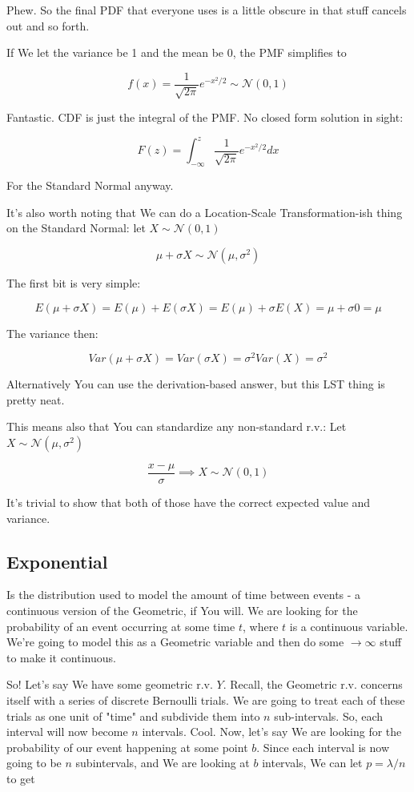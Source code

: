 \documentclass{article}
\begin{document}
		Phew. So the final PDF that everyone uses is a little obscure in that stuff cancels out and so forth.	
		
		If We let the variance be 1 and the mean be 0, the PMF simplifies to
		
		\[ f(x) = \frac{1}{\sqrt{2\pi}} e^{-x^2/2} \sim \mathcal{N}(0, 1)  \]
		
		Fantastic. CDF is just the integral of the PMF. No closed form solution in sight:
		 
		\[ F(z) = \int^z_{-\infty} \frac{1}{\sqrt{2\pi}} e^{-x^2/2} dx   \]
		
		For the Standard Normal anyway. 
		
		It's also worth noting that We can do a Location-Scale Transformation-ish thing on the Standard Normal: let $X\sim \mathcal{N}(0, 1)$
		
		\[ \mu + \sigma X \sim \mathcal{N}(\mu, \sigma^2) \]
		
		The first bit is very simple:
		
		\[ E(\mu + \sigma X) = E(\mu) + E(\sigma X) = E(\mu) + \sigma E(X) = \mu + \sigma 0 = \mu \]
		
		The variance then:
		
		\[ Var(\mu + \sigma X) = Var(\sigma X) = \sigma^2Var(X) = \sigma^2 \]
		
		Alternatively You can use the derivation-based answer, but this LST thing is pretty neat.
		
		This means also that You can standardize any non-standard r.v.: Let $X\sim \mathcal{N}(\mu, \sigma^2)$
		
		\[ \frac{x-\mu}{\sigma} \implies X\sim\mathcal{N}(0, 1) \]
		
		It's trivial to show that both of those have the correct expected value and variance.
		
	\subsection{Exponential}
	
		 Is the distribution used to model the amount of time between events - a continuous version of the Geometric, if You will. We are looking for the probability of an event occurring at some time $t$, where $t$ is a continuous variable. We're going to model this as a Geometric variable and then do some $\to\infty$ stuff to make it continuous.
		 
		 So! Let's say We have some geometric r.v. $Y$. Recall, the Geometric r.v. concerns itself with a series of discrete Bernoulli trials. We are going to treat each of these trials as one unit of "time" and subdivide them into $n$ sub-intervals. So, each interval will now become $n$ intervals. Cool. Now, let's say We are looking for the probability of our event happening at some point $b$. Since each interval is now going to be $n$ subintervals, and We are looking at $b$ intervals, We can let $p = \lambda/n$ to get
		 
\end{document}
